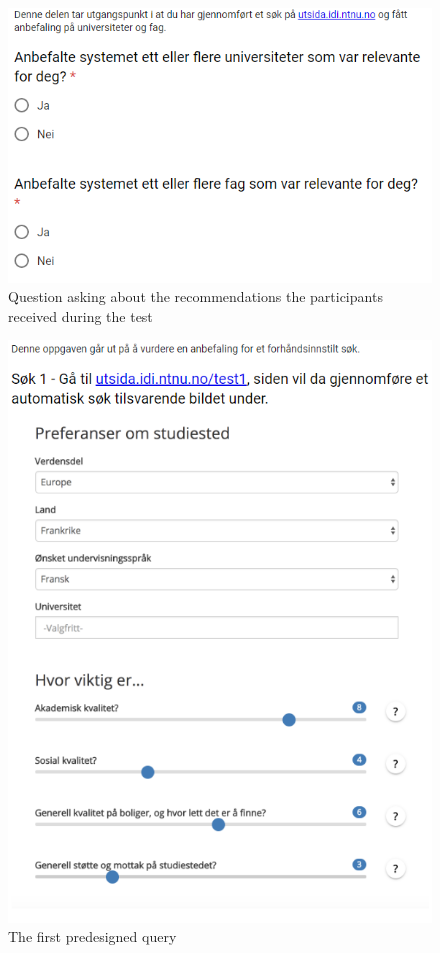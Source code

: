 \begin{figure}[h]
    \centering
    \includegraphics[width=1\textwidth]{fig/form2/s6.PNG}
    \caption[]{Question asking about the recommendations the participants received during the test}
    \label{fig:questionnaire_2_questions_p6}
\end{figure}
\begin{figure}[h]
    \centering
    \includegraphics[width=1\textwidth]{fig/form2/s7_1.PNG}
    \caption[]{The first predesigned query}
    \label{fig:questionnaire_2_questions_p7}
\end{figure}
